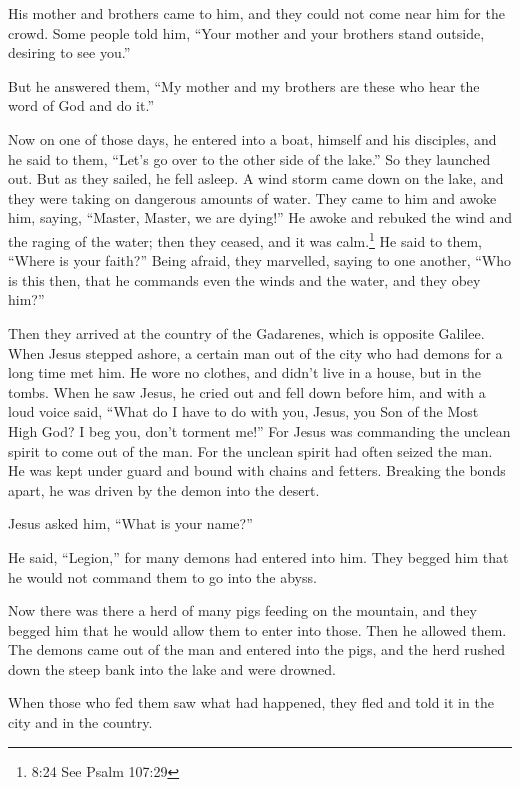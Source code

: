  His mother and brothers came to him, and they could not
come near him for the crowd.  Some people told him, ``Your
mother and your brothers stand outside, desiring to see you.''

 But he answered them, ``My mother and my brothers are
these who hear the word of God and do it.''

 Now on one of those days, he entered into a boat, himself
and his disciples, and he said to them, ``Let's go over to the other
side of the lake.'' So they launched out.  But as they
sailed, he fell asleep. A wind storm came down on the lake, and they
were taking on dangerous amounts of water.  They came to
him and awoke him, saying, ``Master, Master, we are dying!'' He awoke
and rebuked the wind and the raging of the water; then they ceased, and
it was calm.\footnote{8:24 See Psalm 107:29}  He said to
them, ``Where is your faith?'' Being afraid, they marvelled, saying to
one another, ``Who is this then, that he commands even the winds and the
water, and they obey him?''

 Then they arrived at the country of the Gadarenes, which
is opposite Galilee.  When Jesus stepped ashore, a certain
man out of the city who had demons for a long time met him. He wore no
clothes, and didn't live in a house, but in the tombs. 
When he saw Jesus, he cried out and fell down before him, and with a
loud voice said, ``What do I have to do with you, Jesus, you Son of the
Most High God? I beg you, don't torment me!''  For Jesus
was commanding the unclean spirit to come out of the man. For the
unclean spirit had often seized the man. He was kept under guard and
bound with chains and fetters. Breaking the bonds apart, he was driven
by the demon into the desert.

 Jesus asked him, ``What is your name?''

He said, ``Legion,'' for many demons had entered into him. 
They begged him that he would not command them to go into the abyss.

 Now there was there a herd of many pigs feeding on the
mountain, and they begged him that he would allow them to enter into
those. Then he allowed them.  The demons came out of the
man and entered into the pigs, and the herd rushed down the steep bank
into the lake and were drowned.

 When those who fed them saw what had happened, they fled
and told it in the city and in the country.


